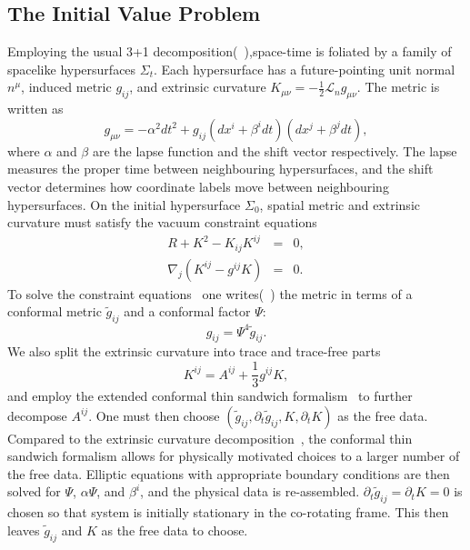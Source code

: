 \subsection{The Initial Value Problem}
\label{subsec:IVP}
Employing the usual 3+1 decomposition(~\cite{ADM,york79}),space-time is foliated by a family
of spacelike hypersurfaces $\Sigma_t$. Each hypersurface has a
future-pointing unit normal $n^{\mu}$, induced metric $g_{ij}$, and
extrinsic curvature
$K_{\mu\nu}=-\frac{1}{2}\mathcal{L}_{n}g_{\mu\nu}$. The metric is
written as 
\begin{equation}
g_{\mu\nu}=-\alpha^2dt^2+g_{ij}\left(dx^i+\beta^idt\right)\left(dx^j+\beta^jdt\right),
\end{equation}
where $\alpha$ and $\beta$ are the lapse function and the shift vector
respectively. The lapse measures the proper time between neighbouring
hypersurfaces, and the shift vector determines how coordinate labels
move between neighbouring hypersurfaces.  On the initial
hypersurface $\Sigma_0$, spatial metric and extrinsic curvature must satisfy the vacuum
constraint equations
\begin{eqnarray}
R+K^2-K_{ij}K^{ij}&=&0, \\
\nabla_j\left(K^{ij}-g^{ij}K\right)&=&0.
\end{eqnarray}
To solve the constraint equations \ one writes(~\cite{Lichnerowicz44})
the metric in terms of a conformal metric $\tilde{g}_{ij}$ and a
conformal factor $\Psi$:
\begin{equation}
g_{ij}=\Psi^4\tilde{g}_{ij}.
\end{equation}
We also split the extrinsic curvature into trace and trace-free parts
\begin{equation}
K^{ij}=A^{ij}+\frac{1}{3}g^{ij}K,
\end{equation}
and employ the extended conformal thin sandwich formalism~\cite{York1999,Pfeiffer2003b} to further
decompose $A^{ij}$.  One must then choose
$\left(\tilde{g}_{ij},\partial_{t}\tilde{g}_{ij},K,\partial_{t}K\right)$
as the free data.  Compared to the extrinsic curvature decomposition~\cite{Murchadha-York:1974b}, the conformal thin sandwich formalism allows for 
physically motivated choices to a larger number of the free data.  Elliptic equations
with appropriate boundary conditions are then solved for $\Psi$,
$\alpha\Psi$, and $\beta^i$, and the physical data is
re-assembled. $\partial_t\tilde{g}_{ij} = \partial_tK = 0$ is chosen
so that system is initially stationary in the co-rotating
frame.  This then leaves $\tilde{g}_{ij}$ and $K$ as the free data to
choose.  

